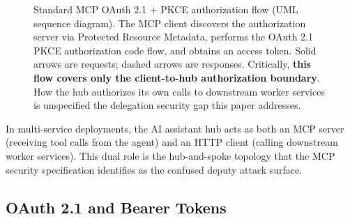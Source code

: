 \documentclass[journal]{IEEEtran}
\begin{document}
\begin{figure}[!ht]
\caption{Standard MCP OAuth 2.1 + PKCE authorization flow (UML sequence
diagram). The MCP client discovers the authorization server via Protected
Resource Metadata, performs the OAuth 2.1 PKCE authorization code flow, and
obtains an access token. Solid arrows are requests; dashed arrows are
responses. Critically, \textbf{this flow covers only the client-to-hub
authorization boundary}. How the hub authorizes its own calls to downstream
worker services is unspecified the delegation security gap this paper
addresses.}
\label{fig:mcp_std_auth}
\end{figure}

In multi-service deployments, the AI assistant hub acts as both an MCP server
(receiving tool calls from the agent) and an HTTP client (calling downstream
worker services). This dual role is the hub-and-spoke topology that the MCP
security specification identifies as the confused deputy attack surface.

\subsection{OAuth 2.1 and Bearer Tokens}
\end{document}
